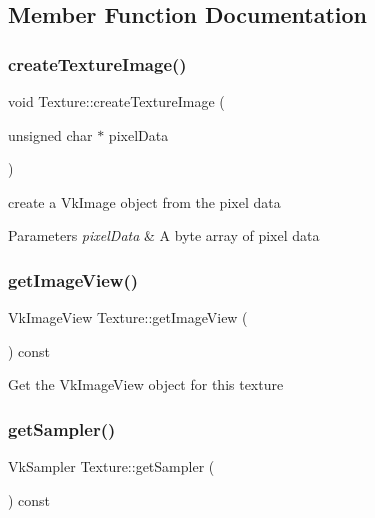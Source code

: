 \subsection{Member Function Documentation}
\mbox{\label{class_texture_a1dca34523d388fef051bbb0234e91047}} 
\subsubsection{\texorpdfstring{createTextureImage()}{createTextureImage()}}
{\footnotesize\ttfamily void Texture\+::create\+Texture\+Image (\begin{DoxyParamCaption}\item[{unsigned char $\ast$}]{pixel\+Data }\end{DoxyParamCaption})\hspace{0.3cm}{\ttfamily [protected]}}



create a Vk\+Image object from the pixel data 


\begin{DoxyParams}{Parameters}
{\em pixel\+Data} & A byte array of pixel data \\
\hline
\end{DoxyParams}
\mbox{\label{class_texture_ae1304d0849bad6d745794edff547fbed}} 
\subsubsection{\texorpdfstring{getImageView()}{getImageView()}}
{\footnotesize\ttfamily Vk\+Image\+View Texture\+::get\+Image\+View (\begin{DoxyParamCaption}{ }\end{DoxyParamCaption}) const\hspace{0.3cm}{\ttfamily [inline]}}

Get the Vk\+Image\+View object for this texture \mbox{\label{class_texture_ac84290121b3faf715445b4905140647d}} 
\subsubsection{\texorpdfstring{getSampler()}{getSampler()}}
{\footnotesize\ttfamily Vk\+Sampler Texture\+::get\+Sampler (\begin{DoxyParamCaption}{ }\end{DoxyParamCaption}) const\hspace{0.3cm}{\ttfamily [inline]}}

